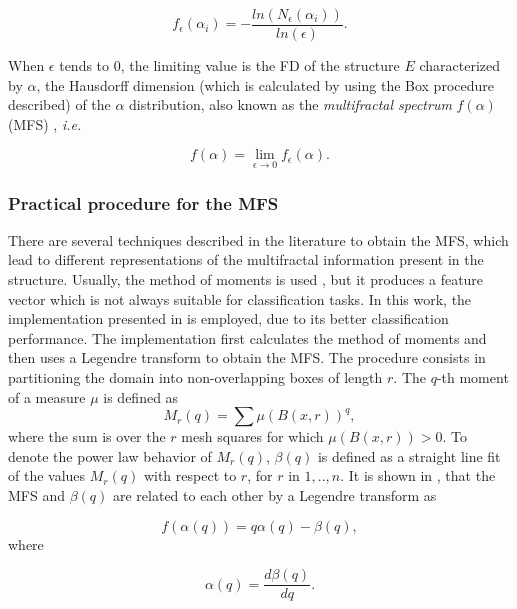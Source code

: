 \documentclass[a4paper,10pt]{article}
\begin{document}
\begin{equation}
f_{\epsilon}(\alpha_{i}) = - \frac{ln(N_{\epsilon}(\alpha_{i}))}{ln(\epsilon)}.
\label{eqn:eqn6}
\end{equation}

When $\epsilon$ tends to $0$, the limiting value is the FD of the structure $E$ characterized by $\alpha$, the Hausdorff dimension (which is calculated by using the Box procedure described) of the $\alpha$ distribution, also known as the {\em multifractal spectrum} $f(\alpha)$ (MFS) \cite{Silvetti2010}, {\em i.e.}

\begin{equation}
f(\alpha) = \lim_{\epsilon\to0}{f_{\epsilon}(\alpha)}.
\label{eqn:eqn7}
\end{equation}

\subsubsection{Practical procedure for the MFS}
There are several techniques described in the literature to obtain the MFS, which lead to different representations of the multifractal information present in the structure. Usually, the method of moments is used \cite{Mendoza2010,Serrano2012}, but it produces a feature vector which is not always suitable for classification tasks. In this work, the implementation presented in \cite{Xu2006} is employed, due to its better classification performance. The implementation first calculates the method of moments and then uses a Legendre transform to obtain the MFS. The procedure consists in partitioning the domain into non-overlapping boxes of length $r$. The $q$-th moment of a measure $\mu$ is defined as
\begin{equation}
M_{r}(q) = \sum{\mu(B(x,r))^{q}},
\label{eqn:eqn8}
\end{equation}
where the sum is over the $r$ mesh squares for which $\mu(B(x,r)) > 0$. To denote the power law behavior of $M_{r}(q)$, $\beta(q)$ is defined as a straight line fit of the values $M_{r}(q)$ with respect to $r$, for $r$ in $1,..,n$. It is shown in \cite{Falconer97}, that the MFS and $\beta(q)$ are related to each other by a Legendre transform as

\begin{equation}
f(\alpha(q)) = q \alpha(q) - \beta(q),
\label{eqn:eqn9}
\end{equation}
where

\begin{equation}
\alpha(q) = \frac{d\beta(q)}{dq}.
\label{eqn:eqn10}
\end{equation}
\end{document}
